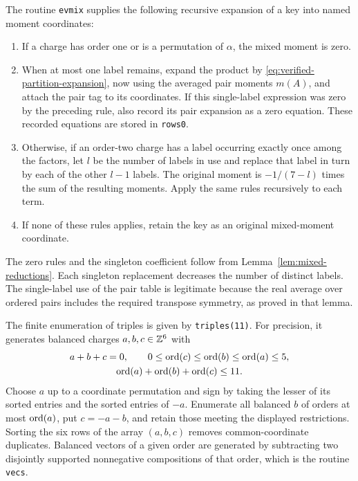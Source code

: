 The routine \texttt{evmix} supplies the following recursive expansion
of a key into named moment coordinates:
\begin{enumerate}[label=(\roman*)]
 \item If a charge has order one or is a permutation of $\alpha$, the
 mixed moment is zero.
 \item When at most one label remains, expand the product by
 \eqref{eq:verified-partition-expansion}, now using the averaged pair
 moments $m(A)$, and attach the pair tag to its coordinates.
 If this single-label expression was zero by the preceding rule,
 also record its pair expansion as a zero equation.  These recorded
 equations are stored in \texttt{rows0}.
 \item Otherwise, if an order-two charge has a label occurring exactly
 once among the factors, let $l$ be the number of labels in use and
 replace that label in turn by each of the other $l-1$ labels.  The
 original moment is $-1/(7-l)$ times the sum of the resulting moments.
 Apply the same rules recursively to each term.
 \item If none of these rules applies, retain the key as an original
 mixed-moment coordinate.
\end{enumerate}
The zero rules and the singleton coefficient follow from
Lemma~\ref{lem:mixed-reductions}.  Each singleton replacement decreases
the number of distinct labels.  The single-label use of the pair table
is legitimate because the real average over ordered pairs includes
the required transpose symmetry, as proved in that lemma.

The finite enumeration of triples is given by \texttt{triples(11)}.
For precision, it generates balanced charges $a,b,c\in\mathbb Z^6$ with
\[
 \begin{gathered}
 a+b+c=0,\qquad 0\le\operatorname{ord}(c)\le\operatorname{ord}(b)\le\operatorname{ord}(a)\le5,\\
 \operatorname{ord}(a)+\operatorname{ord}(b)+\operatorname{ord}(c)\le11.
 \end{gathered}
\]
Choose $a$ up to a coordinate permutation and sign by taking the lesser
of its sorted entries and the sorted entries of $-a$.  Enumerate all
balanced $b$ of orders at most $\operatorname{ord}(a)$, put $c=-a-b$, and retain those
meeting the displayed restrictions.  Sorting the six rows of the
array $(a,b,c)$ removes common-coordinate duplicates.  Balanced
vectors of a given order are generated by subtracting two
disjointly supported nonnegative compositions of that order, which is
the routine \texttt{vecs}.


